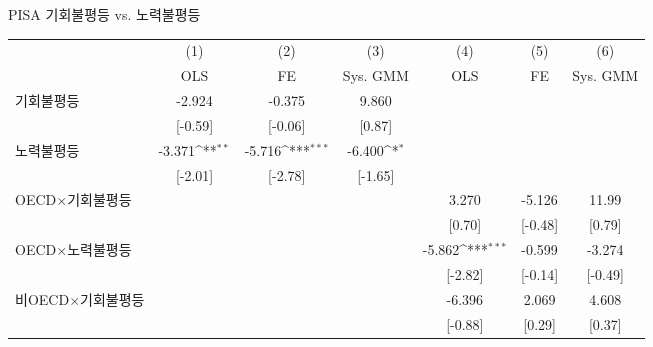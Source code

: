 \centering
\def\sym#1{\ifmmode^{#1}\else\(^{#1}\)\fi}
\caption{PISA 기회불평등 vs. 노력불평등\label{tab:pisacomp}}
\begin{tabular}{l*{6}{c}}
\toprule
                    &\multicolumn{1}{c}{(1)}&\multicolumn{1}{c}{(2)}&\multicolumn{1}{c}{(3)}&\multicolumn{1}{c}{(4)}&\multicolumn{1}{c}{(5)}&\multicolumn{1}{c}{(6)}\\ &\multicolumn{1}{c}{OLS}&\multicolumn{1}{c}{FE}&\multicolumn{1}{c}{Sys. GMM}&\multicolumn{1}{c}{OLS}&\multicolumn{1}{c}{FE}&\multicolumn{1}{c}{Sys. GMM}\\
\midrule
\addlinespace
기회불평등        &      -2.924         &      -0.375         &       9.860         &                     &                     &                     \\
                    &     [-0.59]         &     [-0.06]         &      [0.87]         &                     &                     &                     \\
\addlinespace
노력불평등        &      -3.371\sym{**} &      -5.716\sym{***}&      -6.400\sym{*}  &                     &                     &                     \\
                    &     [-2.01]         &     [-2.78]         &     [-1.65]         &                     &                     &                     \\
\addlinespace
OECD$\times$기회불평등&                     &                     &                     &       3.270         &      -5.126         &       11.99         \\
                    &                     &                     &                     &      [0.70]         &     [-0.48]         &      [0.79]         \\
\addlinespace
OECD$\times$노력불평등&                     &                     &                     &      -5.862\sym{***}&      -0.599         &      -3.274         \\
                    &                     &                     &                     &     [-2.82]         &     [-0.14]         &     [-0.49]         \\
\addlinespace
비OECD$\times$기회불평등&                     &                     &                     &      -6.396         &       2.069         &       4.608         \\
                    &                     &                     &                     &     [-0.88]         &      [0.29]         &      [0.37]         \\

\end{tabular}
